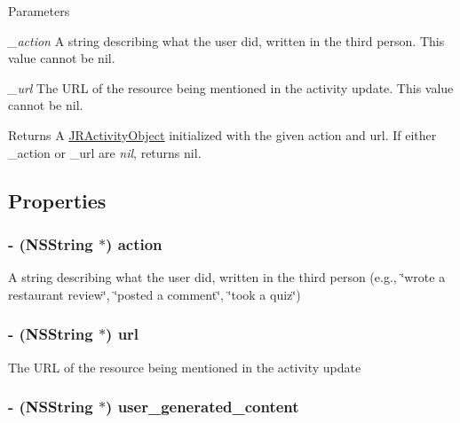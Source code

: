 \begin{DoxyParams}{Parameters}
\item[{\em \_\-action}]A string describing what the user did, written in the third person. This value cannot be {\ttfamily nil}.\item[{\em \_\-url}]The URL of the resource being mentioned in the activity update. This value cannot be {\ttfamily nil}.\end{DoxyParams}
\begin{DoxyReturn}{Returns}
A \hyperlink{interface_j_r_activity_object}{JRActivityObject} initialized with the given action and url. If either {\ttfamily \_\-action} or {\ttfamily \_\-url} are {\itshape nil\/}, returns {\ttfamily nil}. 
\end{DoxyReturn}


\subsection{Properties}
\hypertarget{interface_j_r_activity_object_ac7f87878433a7d69fc5c8677fc317d6a}{
\subsubsection[{action}]{\setlength{\rightskip}{0pt plus 5cm}-\/ (NSString $\ast$) action}}
\label{interface_j_r_activity_object_ac7f87878433a7d69fc5c8677fc317d6a}
A string describing what the user did, written in the third person (e.g., \char`\"{}wrote a restaurant review\char`\"{}, \char`\"{}posted a comment\char`\"{}, \char`\"{}took a quiz\char`\"{}) \hypertarget{interface_j_r_activity_object_a113d240b8b15e625fb0005fbffd00c17}{
\subsubsection[{url}]{\setlength{\rightskip}{0pt plus 5cm}-\/ (NSString $\ast$) url}}
\label{interface_j_r_activity_object_a113d240b8b15e625fb0005fbffd00c17}
The URL of the resource being mentioned in the activity update \hypertarget{interface_j_r_activity_object_a965d03730324bcda4374450ad648505b}{
\subsubsection[{user\_\-generated\_\-content}]{\setlength{\rightskip}{0pt plus 5cm}-\/ (NSString $\ast$) user\_\-generated\_\-content}}

